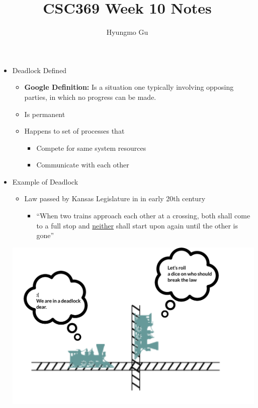 \documentclass[12pt]{article}
\begin{document}
\title{CSC369 Week 10 Notes}
\author{Hyungmo Gu}
\maketitle

\begin{itemize}
    \item Deadlock Defined
    \begin{itemize}
        \item \textbf{Google Definition:} Is a situation one typically involving
        opposing parties, in which no progress can be made.
        \item Is permanent
        \item Happens to set of processes that

        \begin{itemize}
            \item Compete for same system resources
            \item Communicate with each other
        \end{itemize}
    \end{itemize}
    \item Example of Deadlock
    \begin{itemize}
        \item Law passed by Kansas Legislature in in early 20th century
        \begin{itemize}
            \item ``When two trains approach each other at a crossing, both shall
            come to a full stop and \underline{neither} shall start upon again
            until the other is gone''
        \end{itemize}
    \end{itemize}

    \begin{center}
        \includegraphics[width=0.8\linewidth]{images/week_10_notes_1_1.png}
    \end{center}



\end{itemize}
\end{document}

